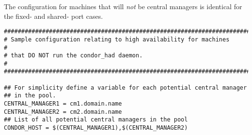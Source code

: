 The configuration for machines that will \emph{not} be central managers
is identical for the fixed- and shared- port cases.
\footnotesize
\begin{verbatim}
##########################################################################
# Sample configuration relating to high availability for machines        #
# that DO NOT run the condor_had daemon.                                 #
##########################################################################

## For simplicity define a variable for each potential central manager
## in the pool.
CENTRAL_MANAGER1 = cm1.domain.name
CENTRAL_MANAGER2 = cm2.domain.name
## List of all potential central managers in the pool
CONDOR_HOST = $(CENTRAL_MANAGER1),$(CENTRAL_MANAGER2)
\end{verbatim}
\normalsize


